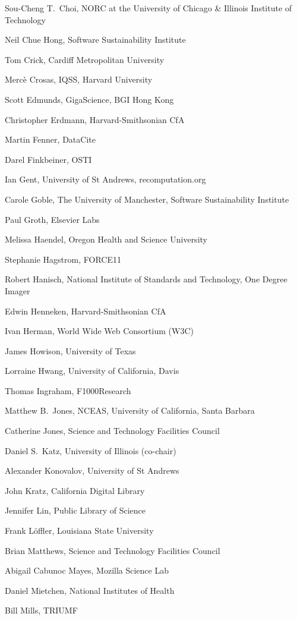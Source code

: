 \documentclass[12pt, oneside]{amsart}
\begin{document}
Sou-Cheng T.~Choi, NORC at the University of Chicago \& Illinois Institute of Technology

Neil Chue Hong, Software Sustainability Institute

Tom Crick, Cardiff Metropolitan University

Merc\`e Crosas, IQSS, Harvard University

Scott Edmunds, GigaScience, BGI Hong Kong

Christopher Erdmann, Harvard-Smithsonian CfA

Martin Fenner, DataCite

Darel Finkbeiner, OSTI

Ian Gent, University of St Andrews, recomputation.org

Carole Goble, The University of Manchester, Software Sustainability Institute

Paul Groth, Elsevier Labs

Melissa Haendel, Oregon Health and Science University

Stephanie Hagstrom, FORCE11

Robert Hanisch, National Institute of Standards and Technology, One Degree Imager

Edwin Henneken, Harvard-Smithsonian CfA

Ivan Herman, World Wide Web Consortium (W3C)

James Howison, University of Texas

Lorraine Hwang, University of California,  Davis

Thomas Ingraham, F1000Research

Matthew B.~Jones, NCEAS, University of California,  Santa Barbara

Catherine Jones, Science and Technology Facilities Council

Daniel S.~Katz, University of Illinois (co-chair)

Alexander Konovalov, University of St Andrews

John Kratz, California Digital Library

Jennifer Lin, Public Library of Science

Frank L\"offler, Louisiana State University

Brian Matthews, Science and Technology Facilities Council

Abigail Cabunoc Mayes, Mozilla Science Lab

Daniel Mietchen, National Institutes of Health

Bill Mills, TRIUMF
\end{document}

